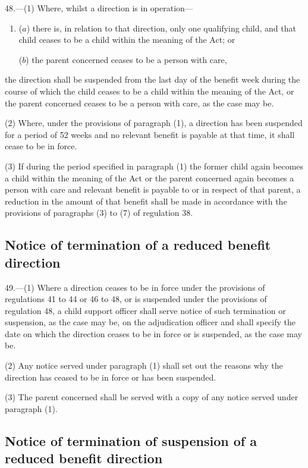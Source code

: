 \documentclass[a4paper]{article}
\begin{document}
48.—(1) Where, whilst a direction is in operation—
\begin{enumerate}\item[]
($a$) there is, in relation to that direction, only one qualifying child, and that child ceases to be a child within the meaning of the Act; or

($b$) the parent concerned ceases to be a person with care,
\end{enumerate}
the direction shall be suspended from the last day of the benefit week during the course of which the child ceases to be a child within the meaning of the Act, or the parent concerned ceases to be a person with care, as the case may be.

(2) Where, under the provisions of paragraph (1), a direction has been suspended for a period of 52 weeks and no relevant benefit is payable at that time, it shall cease to be in force.

(3) If during the period specified in paragraph (1) the former child again becomes a child within the meaning of the Act or the parent concerned again becomes a person with care and relevant benefit is payable to or in respect of that parent, a reduction in the amount of that benefit shall be made in accordance with the provisions of paragraphs (3) to (7) of regulation 38.

\subsection[49. Notice of termination of a reduced benefit direction]{Notice of termination of a reduced benefit direction}

49.—(1) Where a direction ceases to be in force under the provisions of regulations 41 to 44 or 46 to 48, or is suspended under the provisions of regulation 48, a child support officer shall serve notice of such termination or suspension, as the case may be, on the adjudication officer and shall specify the date on which the direction ceases to be in force or is suspended, as the case may be.

(2) Any notice served under paragraph (1) shall set out the reasons why the direction has ceased to be in force or has been suspended.

(3) The parent concerned shall be served with a copy of any notice served under paragraph (1).

\subsection[49A. Notice of termination of suspension of a reduced benefit direction]{Notice of termination of suspension of a reduced benefit direction}
\end{document}
